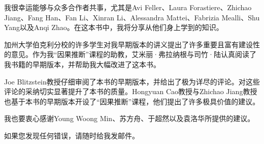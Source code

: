 我很幸运能够与众多合作者共事，尤其是Avi Feller、Laura Forastiere、Zhichao Jiang、Fang Han、Fan Li、Xinran Li、Alessandra Mattei、Fabrizia Mealli、Shu Yang以及Anqi Zhao。在这本书中，我将分享从他们身上学到的知识。 


加州大学伯克利分校的许多学生对我早期版本的讲义提出了许多重要且富有建设性的意见。作为我“因果推断”课程的助教，艾米丽·弗拉纳根与司竹·陆认真阅读了我书籍的早期版本，并帮助我大幅改进了这本书。 


Joe Blitzstein教授仔细审阅了本书的早期版本，并给出了极为详尽的评论。对这些评论的采纳切实显著提升了本书的质量。Hongyuan Cao教授与Zhichao Jiang教授也基于本书的早期版本开设了“因果推断”课程，他们提出了许多极具价值的建议。 


我也要衷心感谢Young Woong Min、苏方舟、于超然以及袁洛华所提供的建议。


如果您发现任何错误，请随时给我发邮件。
